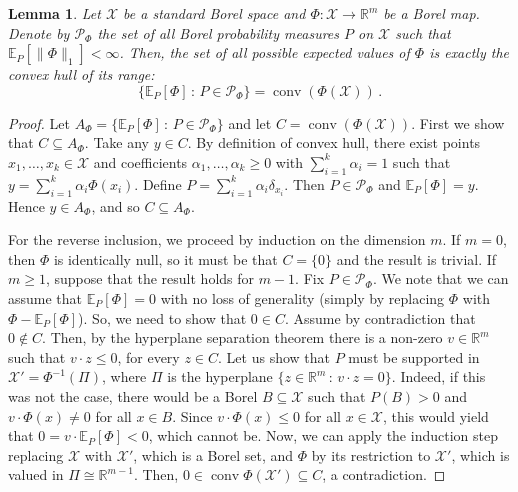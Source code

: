 \documentclass[10pt, a4paper]{article}
\newcommand{\E}{\mathbb E}
\newcommand{\PR}{\mathscr{P}}
\newcommand{\R}{\mathbb R}
\newcommand{\X}{\mathcal X}
\DeclareMathOperator{\conv}{conv}
\newtheorem{lemma}{Lemma}
\begin{document}
\begin{lemma}\label{lemma:convexhull}
    Let $\X$ be a standard Borel space and $\Phi: \X \to \R^m$ be a Borel map. Denote by $\PR_\Phi$ the set of all Borel probability measures $P$ on $\X$ such that $\E_P[\|\Phi\|_1] < \infty$. Then, the set of all possible expected values of $\Phi$ is exactly the convex hull of its range:
    $$ \{ \E_P[\Phi] \,:\, P \in \PR_\Phi \} = \conv(\Phi(\X))\,. $$
\end{lemma}
\begin{proof}
    Let $A_\Phi = \{ \E_P[\Phi] \,:\, P \in \PR_\Phi \}$ and let $C = \conv(\Phi(\X))$. First we show that $C\subseteq A_\Phi$. Take any $y \in C$. By definition of convex hull, there exist points $x_1,\dots,x_k\in\X$ and coefficients $\alpha_1,\dots,\alpha_k\geq 0$ with $\sum_{i=1}^k\alpha_i=1$ such that $y=\sum_{i=1}^k \alpha_i \Phi(x_i)$. Define $P=\sum_{i=1}^k \alpha_i \delta_{x_i}$. Then $P\in\PR_\Phi$ and $\E_P[\Phi]=y$. Hence $y\in A_\Phi$, and so $C\subseteq A_\Phi$.

    For the reverse inclusion, we proceed by induction on the dimension $m$. If $m=0$, then $\Phi$ is identically null, so it must be that $C=\{0\}$ and the result is trivial. If $m\geq 1$, suppose that the result holds for $m-1$. Fix $P\in\PR_\Phi$. We note that we can assume that $\E_P[\Phi]=0$ with no loss of generality (simply by replacing $\Phi$ with $\Phi-\E_P[\Phi]$). So, we need to show that $0\in C$. Assume by contradiction that $0\notin C$. Then, by the hyperplane separation theorem  there is a non-zero $v\in\R^m$  such that $v\cdot z\leq0$, for every $z\in C$. Let us show that $P$ must be supported in $\X' = \Phi^{-1}(\Pi)$, where $\Pi$ is the hyperplane $\{z\in\R^m\,:\,v\cdot z=0 \}$. Indeed, if this was not the case, there would be a Borel $B\subseteq\X$ such that $P(B)>0$ and $v\cdot \Phi(x) \neq 0$ for all $x\in B$. Since $v\cdot \Phi(x)\leq 0$ for all $x\in\X$, this  would yield that $0=v\cdot\E_P[\Phi] < 0$, which cannot be. Now, we can apply the induction step replacing $\X$ with $\X'$, which is a Borel set, and $\Phi$ by its restriction to $\X'$, which is valued in $\Pi\cong\R^{m-1}$. Then, $0\in\conv\Phi(\X') \subseteq C$,  a contradiction.
\end{proof}
\end{document}
